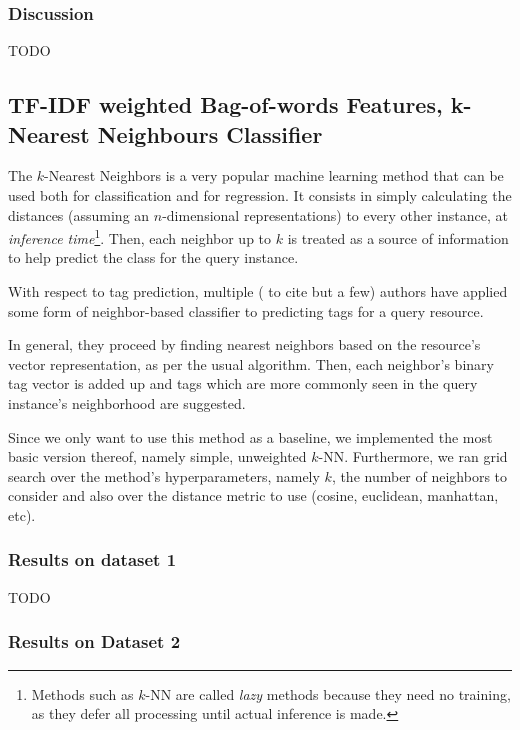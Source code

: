 \subsubsection{Discussion}

{\color{red} TODO}

\subsection{TF-IDF weighted Bag-of-words Features, k-Nearest Neighbours Classifier}

The $k$-Nearest Neighbors is a very popular machine learning method that can be used both for classification and for regression. It consists in simply calculating the distances (assuming an $n$-dimensional representations) to every other instance, at \textit{inference time}\footnote{Methods such as $k$-NN are called \textit{lazy} methods because they need no training, as they defer all processing until actual inference is made.}. Then, each neighbor up to $k$ is treated as a source of information to help predict the class for the query instance. 

With respect to tag prediction, multiple (\cite{martinez_etal_2009,chidlovskii_2012,zhang_etal_2015} to cite but a few) authors have applied some form of neighbor-based classifier to predicting tags for a query resource. 

In general, they proceed by finding nearest neighbors based on the resource's vector representation, as per the usual algorithm. Then, each neighbor's binary tag vector is added up and tags which are more commonly seen in the query instance's neighborhood are suggested.

Since we only want to use this method as a baseline, we implemented the most basic version thereof, namely simple, unweighted $k$-NN. Furthermore, we ran grid search over the method's hyperparameters, namely $k$, the number of neighbors to consider and also over the distance metric to use (cosine, euclidean, manhattan, etc).

\subsubsection{Results on dataset 1}

{\color{red} TODO}

\subsubsection{Results on Dataset 2}


